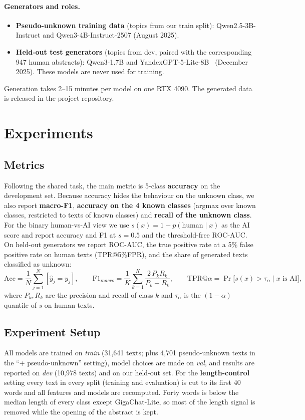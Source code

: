 \documentclass{article}
\begin{document}
\paragraph{Generators and roles.}
\begin{itemize}
\item \textbf{Pseudo-unknown training data} (topics from our train split): Qwen2.5-3B-Instruct and Qwen3-4B-Instruct-2507 (August 2025).
\item \textbf{Held-out test generators} (topics from dev, paired with the corresponding 947 human abstracts): Qwen3-1.7B and YandexGPT-5-Lite-8B~\cite{ainleval2025} (December 2025). These models are never used for training.
\end{itemize}
Generation takes 2--15 minutes per model on one RTX 4090. The generated data is released in the project repository.



\section{Experiments}

\subsection{Metrics}
Following the shared task, the main metric is 5-class \textbf{accuracy} on the development set. Because accuracy hides the behaviour on the unknown class, we also report \textbf{macro-F1}, \textbf{accuracy on the 4 known classes} (argmax over known classes, restricted to texts of known classes) and \textbf{recall of the unknown class}. For the binary human-vs-AI view we use $s(x) = 1 - p(\text{human}\mid x)$ as the AI score and report accuracy and F1 at $s=0.5$ and the threshold-free ROC-AUC. On held-out generators we report ROC-AUC, the true positive rate at a 5\% false positive rate on human texts (TPR@5\%FPR), and the share of generated texts classified as unknown:
\begin{equation}
\mathrm{Acc} = \frac{1}{N}\sum_{j=1}^{N} [\hat y_j = y_j],\qquad
\mathrm{F1}_{macro} = \frac{1}{K}\sum_{k=1}^{K} \frac{2\,P_k R_k}{P_k + R_k},\qquad
\mathrm{TPR@}\alpha = \Pr\big[s(x) > \tau_\alpha \mid x \text{ is AI}\big],
\end{equation}
where $P_k, R_k$ are the precision and recall of class $k$ and $\tau_\alpha$ is the $(1-\alpha)$ quantile of $s$ on human texts.

\subsection{Experiment Setup}
All models are trained on \emph{train} (31{,}641 texts; plus 4{,}701 pseudo-unknown texts in the ``+ pseudo-unknown'' setting), model choices are made on \emph{val}, and results are reported on \emph{dev} (10{,}978 texts) and on our held-out set. For the \textbf{length-control} setting every text in every split (training and evaluation) is cut to its first 40 words and all features and models are recomputed. Forty words is below the median length of every class except GigaChat-Lite, so most of the length signal is removed while the opening of the abstract is kept.
\end{document}
